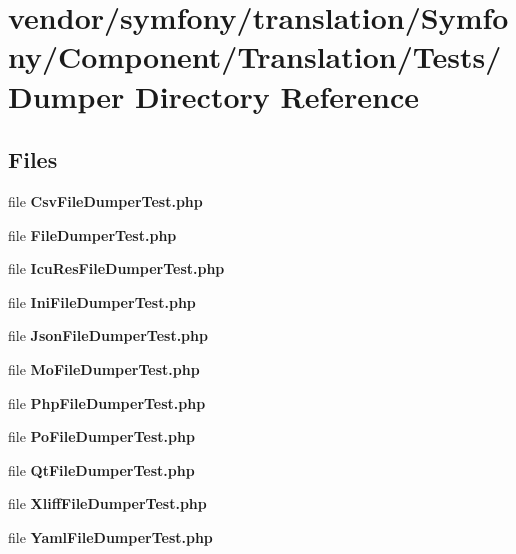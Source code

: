 \section{vendor/symfony/translation/\+Symfony/\+Component/\+Translation/\+Tests/\+Dumper Directory Reference}
\label{dir_44f759fa5e27b25d096fc76c3f5ac56b}
\subsection*{Files}
\begin{DoxyCompactItemize}
\item 
file {\bf Csv\+File\+Dumper\+Test.\+php}
\item 
file {\bf File\+Dumper\+Test.\+php}
\item 
file {\bf Icu\+Res\+File\+Dumper\+Test.\+php}
\item 
file {\bf Ini\+File\+Dumper\+Test.\+php}
\item 
file {\bf Json\+File\+Dumper\+Test.\+php}
\item 
file {\bf Mo\+File\+Dumper\+Test.\+php}
\item 
file {\bf Php\+File\+Dumper\+Test.\+php}
\item 
file {\bf Po\+File\+Dumper\+Test.\+php}
\item 
file {\bf Qt\+File\+Dumper\+Test.\+php}
\item 
file {\bf Xliff\+File\+Dumper\+Test.\+php}
\item 
file {\bf Yaml\+File\+Dumper\+Test.\+php}
\end{DoxyCompactItemize}

